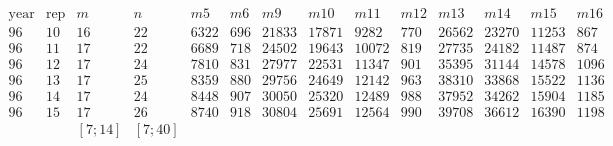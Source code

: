 \documentclass[8pt]{beamer}
\begin{document}
{\scriptsize{
  $$
  \begin{array}{cc|cc|rrrrrrrrrr}
  \text{year} & \text{rep} & m & n & m{5} & m{6} & m{9} & m{10} & m{11} & m{12} & m{13} & m{14} & m{15} & m{16} \\
  \hline
  96 & 10 & 16 & 22 & 6322 & 696 & 21833 & 17871 & 9282 & 770 & 26562 & 23270 & 11253 & 867 \\
  96 & 11 & 17 & 22 & 6689 & 718 & 24502 & 19643 & 10072 & 819 & 27735 & 24182 & 11487 & 874 \\
  96 & 12 & 17 & 24 & 7810 & 831 & 27977 & 22531 & 11347 & 901 & 35395 & 31144 & 14578 & 1096 \\
  96 & 13 & 17 & 25 & 8359 & 880 & 29756 & 24649 & 12142 & 963 & 38310 & 33868 & 15522 & 1136 \\
  96 & 14 & 17 & 24 & 8448 & 907 & 30050 & 25320 & 12489 & 988 & 37952 & 34262 & 15904 & 1185 \\
  96 & 15 & 17 & 26 & 8740 & 918 & 30804 & 25691 & 12564 & 990 & 39708 & 36612 & 16390 & 1198 \\
  & & [7; 14] & [7; 40] & 
  \end{array}
  $$
  
}
}
\end{document}
